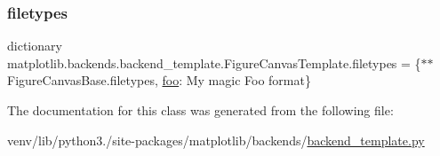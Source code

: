\subsubsection{\texorpdfstring{filetypes}{filetypes}}
{\footnotesize\ttfamily dictionary matplotlib.\+backends.\+backend\+\_\+template.\+Figure\+Canvas\+Template.\+filetypes = \{$\ast$$\ast$Figure\+Canvas\+Base.\+filetypes, \textquotesingle{}\hyperlink{size_2foo_8f90_a6e9dfcbd55e5ab1066524746915b4f19}{foo}\textquotesingle{}\+: \textquotesingle{}My magic Foo format\textquotesingle{}\}\hspace{0.3cm}{\ttfamily [static]}}



The documentation for this class was generated from the following file\+:\begin{DoxyCompactItemize}
\item 
venv/lib/python3./site-\/packages/matplotlib/backends/\hyperlink{backend__template_8py}{backend\+\_\+template.\+py}\end{DoxyCompactItemize}
